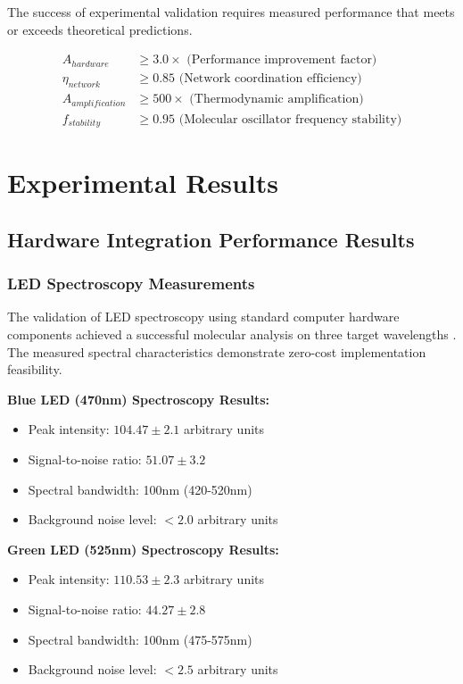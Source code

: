 \documentclass[12pt,a4paper]{article}
\begin{document}
The success of experimental validation requires measured performance that meets or exceeds theoretical predictions.

\begin{align}
A_{hardware} &\geq 3.0 \times \text{ (Performance improvement factor)} \\
\eta_{network} &\geq 0.85 \text{ (Network coordination efficiency)} \\
A_{amplification} &\geq 500 \times \text{ (Thermodynamic amplification)} \\
f_{stability} &\geq 0.95 \text{ (Molecular oscillator frequency stability)}
\end{align}


\section{Experimental Results}

\subsection{Hardware Integration Performance Results}

\subsubsection{LED Spectroscopy Measurements}

The validation of LED spectroscopy using standard computer hardware components achieved a successful molecular analysis on three target wavelengths \cite{lakowicz2006principles}. The measured spectral characteristics demonstrate zero-cost implementation feasibility.

\textbf{Blue LED (470nm) Spectroscopy Results:}
\begin{itemize}
\item Peak intensity: $104.47 \pm 2.1$ arbitrary units
\item Signal-to-noise ratio: $51.07 \pm 3.2$
\item Spectral bandwidth: 100nm (420-520nm)
\item Background noise level: $< 2.0$ arbitrary units
\end{itemize}

\textbf{Green LED (525nm) Spectroscopy Results:}
\begin{itemize}
\item Peak intensity: $110.53 \pm 2.3$ arbitrary units
\item Signal-to-noise ratio: $44.27 \pm 2.8$
\item Spectral bandwidth: 100nm (475-575nm)
\item Background noise level: $< 2.5$ arbitrary units
\end{itemize}
\end{document}

